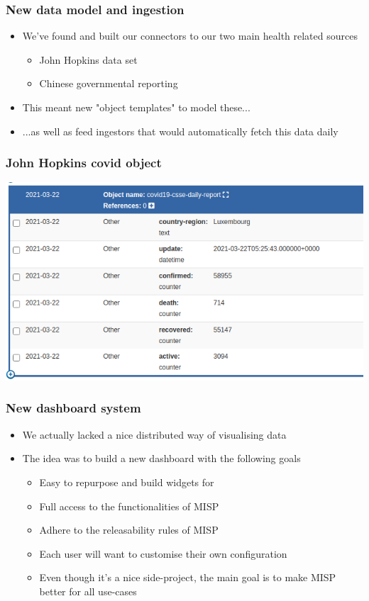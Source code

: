 \begin{frame}
 \frametitle{New data model and ingestion}
 \begin{itemize}
         \item We've found and built our connectors to our two main health related sources
         \begin{itemize}
              \item John Hopkins data set
              \item Chinese governmental reporting
         \end{itemize}
         \item This meant new "object templates" to model these...
         \item ...as well as feed ingestors that would automatically fetch this data daily
 \end{itemize}
\end{frame}

\begin{frame}
 \frametitle{John Hopkins covid object}
 \includegraphics[width=1.00\linewidth]{csse.png}
\end{frame}

\begin{frame}
 \frametitle{New dashboard system}
 \begin{itemize}
         \item We actually lacked a nice distributed way of visualising data
         \item The idea was to build a new dashboard with the following goals
         \begin{itemize}
              \item Easy to repurpose and build widgets for
              \item Full access to the functionalities of MISP
              \item Adhere to the releasability rules of MISP
              \item Each user will want to customise their own configuration
              \item Even though it's a nice side-project, the main goal is to make MISP better for all use-cases
         \end{itemize}
 \end{itemize}
\end{frame}

